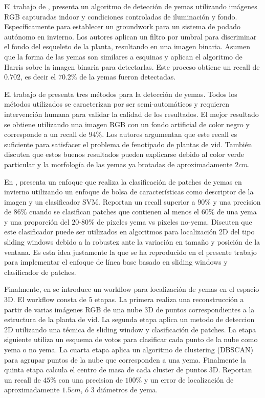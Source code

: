 \documentclass[a4paper,authoryear,review]{elsarticle}
\begin{document}
El trabajo de \citet{xu2014detection}, presenta un algoritmo de detección de yemas utilizando imágenes RGB capturadas indoor y condiciones controladas de iluminación y fondo. Específicamente para establecer un groundwork para un sistema de podado autónomo en invierno. Los autores aplican un filtro por umbral para discriminar el fondo del esqueleto de la planta, resultando en una imagen binaria. Asumen que la forma de las yemas son similares a esquinas y aplican el algoritmo de Harris sobre la imagen binaria para detectarlas. Este proceso obtiene un recall de $0.702$, es decir el $70.2\%$ de la yemas fueron detectadas. 

El trabajo de \citet{herzog2014objective} presenta tres métodos para la detección de yemas. Todos los métodos utilizados se caracterizan por ser semi-automáticos y requieren intervención humana para validar la calidad de los resultados. El mejor resultado se obtiene utilizando una imagen RGB con un fondo artificial de color negro y corresponde a un recall de $94\%$. Los autores argumentan que este recall es suficiente para satisfacer el problema de fenotipado de plantas de vid. También discuten que estos buenos resultados pueden explicarse debido al color verde particular y la morfología de las yemas ya brotadas de aproximadamente $2cm$. 

En \citet{perez2017image}, presenta un enfoque que realiza la clasificación de patches de yemas en invierno utilizando un enfoque de bolsa de características como descriptor de la imagen y un clasificador SVM. Reportan un recall superior a $90\%$ y una precision de $86\%$ cuando se clasifican patches que contienen al menos el $60\%$ de una yema y una proporción del $20$-$80\%$ de pixeles yema vs pixeles no-yema. Discuten que este clasificador puede ser utilizados en algoritmos para localización 2D del tipo sliding windows debido a la robustez ante la variación en tamaño y posición de la ventana. Es esta idea justamente la que se ha reproducido en el presente trabajo para implementar el enfoque de línea base basado en sliding windows y clasificador de patches.

Finalmente, en \citet{diaz2018grapevine} se introduce un workflow para localización de yemas en el espacio 3D. El workflow consta de 5 etapas. La primera realiza una reconstrucción a partir de varias imágenes RGB de una nube 3D de puntos correspondientes a la estructura de la planta de vid. La segunda etapa aplica un metodo de deteccion 2D utilizando una técnica de sliding window y clasificación de patches. La etapa siguiente utiliza un esquema de votos para clasificar cada punto de la nube como yema o no yema. La cuarta etapa aplica un algoritmo de clustering (DBSCAN) para agrupar puntos de la nube que corresponden a una yema. Finalmente la quinta etapa calcula el centro de masa de cada cluster de puntos 3D.  Reportan un recall de $45\%$ con una precision de $100\%$ y un error de localización de aproximadamente $1.5cm$, ó 3 diámetros de yema. 
\end{document}
